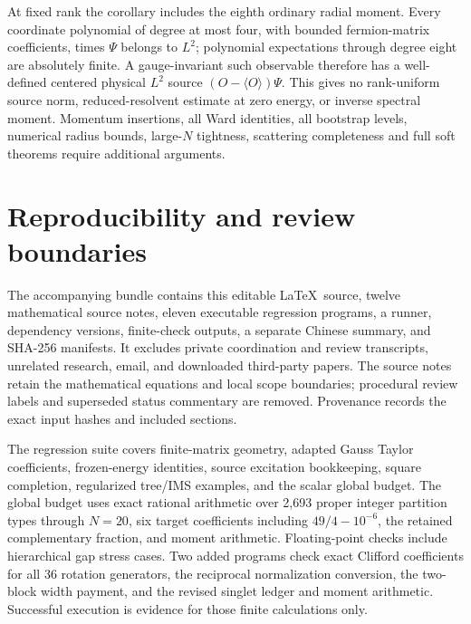 \documentclass[11pt,letterpaper]{article}
\theoremstyle{definition}\newtheorem{hypothesis}[theorem]{Hypothesis}
\numberwithin{equation}{section}
\begin{document}
At fixed rank the corollary includes the eighth ordinary radial moment. Every coordinate polynomial of degree at most four, with bounded fermion-matrix coefficients, times $\Psi$ belongs to $L^2$; polynomial expectations through degree eight are absolutely finite. A gauge-invariant such observable therefore has a well-defined centered physical $L^2$ source $(O-\langle O\rangle)\Psi$. This gives no rank-uniform source norm, reduced-resolvent estimate at zero energy, or inverse spectral moment. Momentum insertions, all Ward identities, all bootstrap levels, numerical radius bounds, large-$N$ tightness, scattering completeness and full soft theorems require additional arguments.

\section{Reproducibility and review boundaries}
The accompanying bundle contains this editable \LaTeX\ source, twelve mathematical source notes, eleven executable regression programs, a runner, dependency versions, finite-check outputs, a separate Chinese summary, and SHA-256 manifests. It excludes private coordination and review transcripts, unrelated research, email, and downloaded third-party papers. The source notes retain the mathematical equations and local scope boundaries; procedural review labels and superseded status commentary are removed. Provenance records the exact input hashes and included sections.

The regression suite covers finite-matrix geometry, adapted Gauss Taylor coefficients, frozen-energy identities, source excitation bookkeeping, square completion, regularized tree/IMS examples, and the scalar global budget. The global budget uses exact rational arithmetic over 2,693 proper integer partition types through $N=20$, six target coefficients including $49/4-10^{-6}$, the retained complementary fraction, and moment arithmetic. Floating-point checks include hierarchical gap stress cases. Two added programs check exact Clifford coefficients for all 36 rotation generators, the reciprocal normalization conversion, the two-block width payment, and the revised singlet ledger and moment arithmetic. Successful execution is evidence for those finite calculations only.
\end{document}

